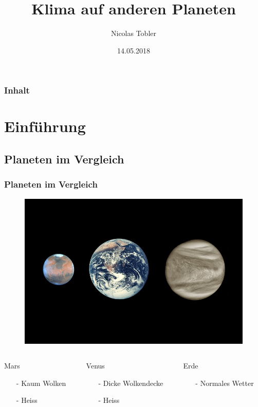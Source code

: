 \documentclass{beamer}
\title{Klima auf anderen Planeten}
\author{Nicolas Tobler}
\institute{Mathematisches Seminar 2018}
\date{14.05.2018}
\begin{document}
\begin{frame}
\titlepage
\end{frame}

\begin{frame}
\frametitle{Inhalt}
\tableofcontents
\end{frame}

\section{Einführung}

\subsection{Planeten im Vergleich}
\begin{frame}
	\frametitle{Planeten im Vergleich}
	
	\begin{figure}
	\center
	\includegraphics[width=0.7\linewidth]{planets.jpg}
	\end{figure}
	
\begin{columns}
\begin{column}{0.33\textwidth}
   Mars
   \begin{itemize}
   		\item[-] Kaum Wolken
   		\item[-] Heiss
   \end{itemize}
\end{column}
\begin{column}{0.33\textwidth}
   Venus
   \begin{itemize}
   		\item[-] Dicke Wolkendecke
   		\item[-] Heiss
   \end{itemize}
\end{column}
\begin{column}{0.33\textwidth}
   Erde
   \begin{itemize}
   		\item[-] Normales Wetter
   \end{itemize}
\end{column}
\end{columns}

\end{frame}
\end{document}
